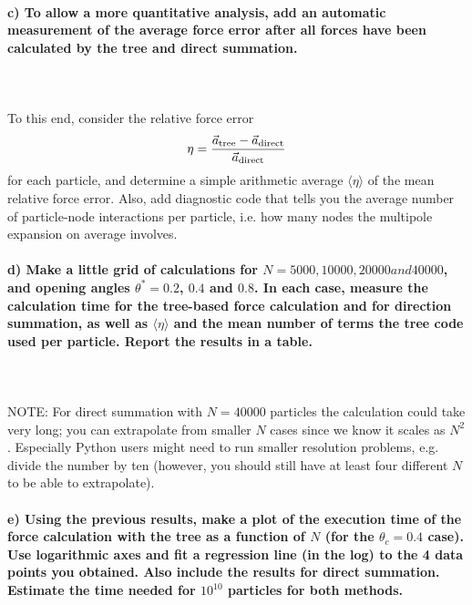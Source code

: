 \paragraph{c)
    To allow a more quantitative analysis, add an automatic 
    measurement of the average force error after all forces 
    have been calculated by the tree and direct summation.
} \ \\ 
    \\
To this end, consider the relative force error
\begin{equation}
    \eta
    =\frac{\vec{a}_\textnormal{tree}-
    \vec{a}_\textnormal{direct}}{\vec{a}_\textnormal{direct}}
\end{equation}
for each particle, and determine a simple arithmetic average 
$\langle\eta\rangle$ of the mean relative force error. Also, 
add diagnostic code that tells you the average number of 
particle-node interactions per particle, i.e. how many nodes 
the multipole expansion on average involves.


\paragraph{d) Make a little grid of calculations for 
    $N=5000, 10000, 20000 and 40000$, and opening angles 
    $\theta^*=0.2$, $0.4$ and $0.8$. In each case, measure the 
    calculation time for the tree-based force calculation and 
    for direction summation, as well as $\langle\eta\rangle$ 
    and the mean number of terms the tree code used per particle. 
    Report the results in a table.
} \ \\
    \\
    NOTE: For direct summation with $N=40000$ particles the 
    calculation could take very long; you can extrapolate from 
    smaller $N$ cases since we know it scales as $N^2$.
    Especially Python users might need to run smaller resolution 
    problems, e.g. divide the number by ten (however, you should 
    still have at least four different $N$ to be able to 
    extrapolate).

\paragraph{e)
    Using the previous results, make a plot of the execution 
    time of the force calculation with the tree as a function of 
    $N$ (for the $\theta_c=0.4$ case). Use logarithmic axes and 
    fit a regression line (in the log) to the 4 data points you 
    obtained. Also include the results for direct summation. 
    Estimate the time needed for $10^10$ particles for both 
    methods.
}
